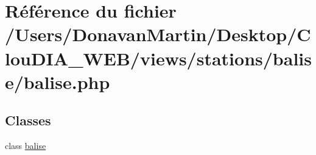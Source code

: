 \hypertarget{balise_8php}{}\section{Référence du fichier /\+Users/\+Donavan\+Martin/\+Desktop/\+Clou\+D\+I\+A\+\_\+\+W\+E\+B/views/stations/balise/balise.php}
\label{balise_8php}
\subsection*{Classes}
\begin{DoxyCompactItemize}
\item 
class \hyperlink{classbalise}{balise}
\end{DoxyCompactItemize}
